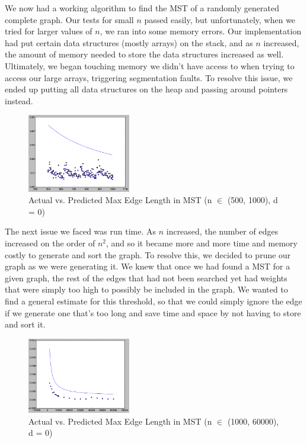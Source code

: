 \documentclass[12pt]{article}
\begin{document}
We now had a working algorithm to find the MST of a randomly generated complete graph. Our tests for small $n$ passed easily, but unfortunately, when we tried for larger values of $n$, we ran into some memory errors. Our implementation had put certain data structures (mostly arrays) on the stack, and as $n$ increased, the amount of memory needed to store the data structures increased as well. Ultimately, we began touching memory we didn't have access to when trying to access our large arrays, triggering segmentation faults. To resolve this issue, we ended up putting all data structures on the heap and passing around pointers instead. \\

\begin{figure}
\vspace{0cm}
\centering
\includegraphics[width=0.4\textwidth]{img/knd0n2.png}
\caption{Actual vs. Predicted Max Edge Length in MST (n $\in$ (500, 1000), d = 0)}
\end{figure}

The next issue we faced was run time. As $n$ increased, the number of edges increased on the order of $n^2$, and so it became more and more time and memory costly to generate and sort the graph. To resolve this, we decided to prune our graph as we were generating it. We knew that once we had found a MST for a given graph, the rest of the edges that had not been searched yet had weights that were simply too high to possibly be included in the graph. We wanted to find a general estimate for this threshold, so that we could simply ignore the edge if we generate one that's too long and save time and space by not having to store and sort it. \\

\begin{figure}
\vspace{-0.5cm}
\centering
\includegraphics[width=0.4\textwidth]{img/knd0n3.png}
\caption{Actual vs. Predicted Max Edge Length in MST (n $\in$ (1000, 60000), d = 0)}
\end{figure}
\end{document}
